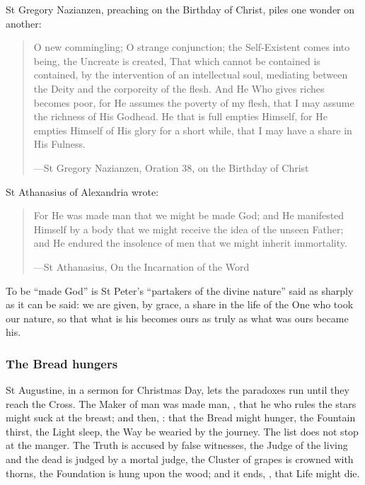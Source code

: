 St Gregory Nazianzen, preaching on the Birthday of Christ, piles one wonder on
another:

\begin{quote}
O new commingling; O strange conjunction; the Self-Existent comes into being,
the Uncreate is created, That which cannot be contained is contained, by the
intervention of an intellectual soul, mediating between the Deity and the
corporeity of the flesh. And He Who gives riches becomes poor, for He assumes
the poverty of my flesh, that I may assume the richness of His Godhead. He that
is full empties Himself, for He empties Himself of His glory for a short while,
that I may have a share in His Fulness.\par
{\smallskip\noindent\small ---St Gregory Nazianzen, Oration 38, on the Birthday of Christ\par}
\end{quote}

St Athanasius of Alexandria wrote:

\begin{quote}
For He was made man that we might be made God; and He manifested Himself by a
body that we might receive the idea of the unseen Father; and He endured the
insolence of men that we might inherit immortality.\par
{\smallskip\noindent\small ---St Athanasius, On the Incarnation of the Word\par}
\end{quote}

To be ``made God'' is St Peter's ``partakers of the divine nature'' said as sharply
as it can be said: we are given, by grace, a share in the life of the One who
took our nature, so that what is his becomes ours as truly as what was ours
became his.

\subsubsection*{The Bread hungers}

St Augustine, in a sermon for Christmas Day, lets the paradoxes run until they
reach the Cross. The Maker of man was made man, , that he who rules the stars might suck at the breast; and then,
: that the Bread might hunger, the Fountain thirst, the Light sleep,
the Way be wearied by the journey. The list does not stop at the manger. The
Truth is accused by false witnesses, the Judge of the living and the dead is
judged by a mortal judge, the Cluster of grapes is crowned with thorns, the
Foundation is hung upon the wood; and it ends, , that Life
might die.

